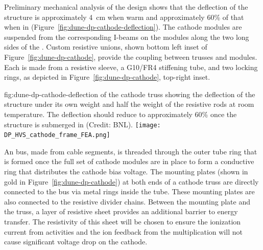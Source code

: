 Preliminary mechanical analysis of the design shows that the deflection of the structure is approximately \SI{4}{\cm} when warm and approximately \num{60}\% of that when in  (Figure~\ref{fig:dune-dp-cathode-deflection}).  The cathode modules are suspended %
from the corresponding  I-beams on the  modules along the two long %
sides of the . %
Custom resistive unions, shown bottom left inset of Figure~\ref{fig:dune-dp-cathode}, provide the coupling between trusses and  modules.  Each is made from a resistive sleeve, a G10/FR4 stiffening tube, and two locking rings, as depicted in Figure~\ref{fig:dune-dp-cathode}, top-right inset. 

\begin{dunefigure}{fig:dune-dp-cathode-deflection}
{ of the cathode truss showing the deflection of the structure under its own weight and half the weight of the  resistive rods at room temperature.  The deflection should reduce to approximately 60\% once the structure is submerged in   (Credit: BNL).}
\texttt{[image: DP\_HVS\_cathode\_frame\_FEA.png]}
\end{dunefigure}


An  bus, made from  cable segments, is threaded through the outer tube ring that is formed once the full set of cathode modules are in place to form a conductive ring that distributes the cathode bias voltage.  The mounting plates (shown in gold in Figure~\ref{fig:dune-dp-cathode}) at both ends of a cathode truss are directly connected to the  bus via metal rings inside the tube.  These mounting plates are also connected to the  resistive divider chains. Between the mounting plate and the %
truss, a layer of resistive sheet provides an additional barrier to energy transfer.  The resistivity of this sheet will be chosen to ensure the ionization current from  activities  and the ion feedback from the  multiplication will not cause significant voltage drop on the cathode.


